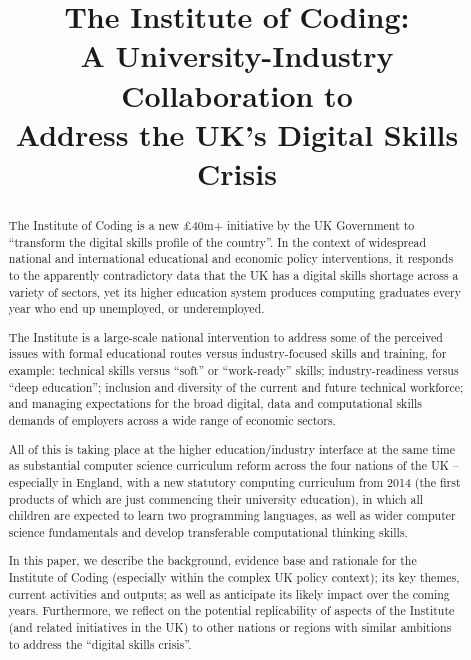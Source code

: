\documentclass[conference]{IEEEtran}
\begin{document}
\title{The Institute of Coding:\\A University-Industry Collaboration
  to\\Address the UK's Digital Skills Crisis}

\author{
} %
 
\maketitle

\begin{abstract}
The Institute of Coding is a new \pounds40m+ initiative by the UK
Government to ``transform the digital skills profile of the
country''. In the context of widespread national and international
educational and economic policy interventions, it responds to the
apparently contradictory data that the UK has a digital skills
shortage across a variety of sectors, yet its higher education system
produces computing graduates every year who end up unemployed, or
underemployed.

The Institute is a large-scale national intervention to address some
of the perceived issues with formal educational routes versus
industry-focused skills and training, for example: technical skills
versus ``soft'' or ``work-ready'' skills; industry-readiness versus
``deep education''; inclusion and diversity of the current and future
technical workforce; and managing expectations for the broad digital,
data and computational skills demands of employers across a wide range
of economic sectors.

All of this is taking place at the higher education/industry interface
at the same time as substantial computer science curriculum reform
across the four nations of the UK -- especially in England, with a new
statutory computing curriculum from 2014 (the first products of which
are just commencing their university education), in which all children
are expected to learn two programming languages, as well as wider
computer science fundamentals and develop transferable computational
thinking skills.

In this paper, we describe the background, evidence base and rationale
for the Institute of Coding (especially within the complex UK policy
context); its key themes, current activities and outputs; as well as
anticipate its likely impact over the coming years. Furthermore, we
reflect on the potential replicability of aspects of the Institute
(and related initiatives in the UK) to other nations or regions with
similar ambitions to address the ``digital skills crisis''.
\end{abstract}
\end{document}
